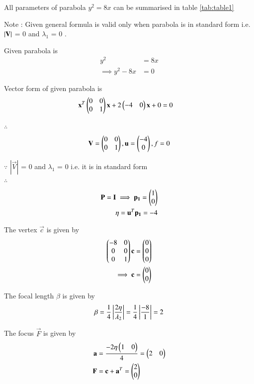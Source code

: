 \documentclass[journal,12pt,twocolumn]{IEEEtran}
\begin{document}
All parameters of parabola $y^2=8x$ can be summarised in table \ref{tab:table1}

Note : Given general formula is valid only when parabola is in standard form i.e. $\left\vert\mathbf{V}\right\vert$ = 0 and $\lambda_1$ = 0 . 

Given parabola is 
\begin{align}
y^2 &= 8x
\\
\implies y^2 - 8x &= 0
\end{align}

Vector form of given parabola is
\begin{align}
\mathbf{x}^T\begin{pmatrix}0 & 0 \\ 0 & 1\end{pmatrix}\mathbf{x} + 2\begin{pmatrix}-4 & 0\end{pmatrix}\mathbf{x} + 0 &= 0 
\end{align}

$\therefore$
\begin{align}
 \mathbf{V} = \begin{pmatrix}0 & 0 \\ 0 & 1\end{pmatrix} ,
 \mathbf{u} = \begin{pmatrix}-4\\0\end{pmatrix} ,
 f = 0
\end{align}

$\because$
$|\vec{V}|$ = 0 and $\lambda_1$ = 0 i.e. it is in standard form
\\
$\therefore$
\begin{align}
\mathbf{P}=\mathbf{I} \implies \mathbf{p_1} = \begin{pmatrix}1\\0\end{pmatrix}
\\
\eta = \mathbf{u}^T\mathbf{p_1} = -4
\end{align}

The vertex $\vec{c}$ is given by
\begin{align}
\begin{pmatrix}-8 & 0\\0 & 0\\0 & 1\end{pmatrix}\mathbf{c} &= \begin{pmatrix}0\\0\\0\end{pmatrix}
\\
\implies \mathbf{c} &= \begin{pmatrix}0\\0\end{pmatrix}
\end{align}

The focal length $\beta$ is given by
\begin{align}
\beta = \frac{1}{4}\left\vert\frac{2\eta}{\lambda_2}\right\vert = \frac{1}{4}\left\vert\frac{-8}{1}\right\vert= 2
\end{align}

The focus $\vec{F}$ is given by
\begin{align}
\mathbf{a} &= \frac{-2\eta\begin{pmatrix}1 & 0\end{pmatrix}}{4} = \begin{pmatrix}2 & 0\end{pmatrix}
\\
\mathbf{F} &= \mathbf{c} + \mathbf{a}^T = \begin{pmatrix}2\\0\end{pmatrix}
\end{align}
\end{document}

